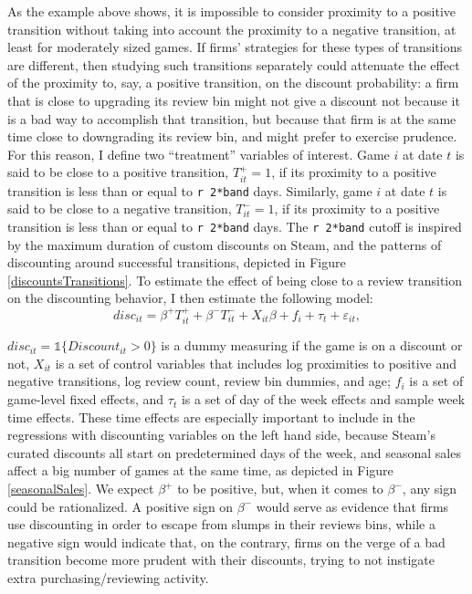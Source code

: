 \documentclass[
  12pt,
  pagebackref]{article}
\begin{document}
As the example above shows, it is impossible to consider proximity to a
positive transition without taking into account the proximity to a
negative transition, at least for moderately sized games. If firms'
strategies for these types of transitions are different, then studying
such transitions separately could attenuate the effect of the proximity
to, say, a positive transition, on the discount probability: a firm that
is close to upgrading its review bin might not give a discount not
because it is a bad way to accomplish that transition, but because that
firm is at the same time close to downgrading its review bin, and might
prefer to exercise prudence. For this reason, I define two ``treatment''
variables of interest. Game \(i\) at date \(t\) is said to be close to a
positive transition, \(T_{it}^+ = 1\), if its proximity to a positive
transition is less than or equal to \texttt{r\ 2*band} days. Similarly,
game \(i\) at date \(t\) is said to be close to a negative transition,
\(T_{it}^- = 1\), if its proximity to a positive transition is less than
or equal to \texttt{r\ 2*band} days. The \texttt{r\ 2*band} cutoff is
inspired by the maximum duration of custom discounts on Steam, and the
patterns of discounting around successful transitions, depicted in
Figure \ref{discountsTransitions}. To estimate the effect of being close
to a review transition on the discounting behavior, I then estimate the
following model: \begin{equation}\label{potTransitionsReg}
disc_{it} = \beta^+ T_{it}^+ + \beta^- T_{it}^- + X_{it}\beta + f_i + \tau_t + \varepsilon_{it},
\end{equation}

\noindent \(disc_{it} = \mathds{1}\{Discount_{it} > 0\}\) is a dummy
measuring if the game is on a discount or not, \(X_{it}\) is a set of
control variables that includes log proximities to positive and negative
transitions, log review count, review bin dummies, and age; \(f_i\) is a
set of game-level fixed effects, and \(\tau_t\) is a set of day of the
week effects and sample week time effects. These time effects are
especially important to include in the regressions with discounting
variables on the left hand side, because Steam's curated discounts all
start on predetermined days of the week, and seasonal sales affect a big
number of games at the same time, as depicted in Figure
\ref{seasonalSales}. We expect \(\beta^+\) to be positive, but, when it
comes to \(\beta^-\), any sign could be rationalized. A positive sign on
\(\beta^-\) would serve as evidence that firms use discounting in order
to escape from slumps in their reviews bins, while a negative sign would
indicate that, on the contrary, firms on the verge of a bad transition
become more prudent with their discounts, trying to not instigate extra
purchasing/reviewing activity.
\end{document}
